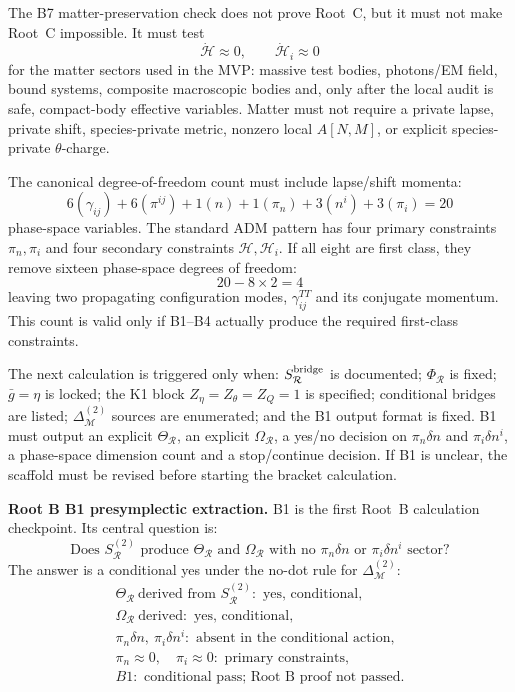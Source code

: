 \documentclass[11pt]{article}
\begin{document}
The B7 matter-preservation check does not prove Root~C, but it must not make
Root~C impossible.  It must test
\[
\boxed{\dot{\mathcal H}\approx0,\qquad \dot{\mathcal H}_i\approx0}
\]
for the matter sectors used in the MVP: massive test bodies, photons/EM field,
bound systems, composite macroscopic bodies and, only after the local audit is
safe, compact-body effective variables.  Matter must not require a private
lapse, private shift, species-private metric, nonzero local \(A[N,M]\), or
explicit species-private \(\theta\)-charge.

The canonical degree-of-freedom count must include lapse/shift momenta:
\[
\boxed{
6(\gamma_{ij})+6(\pi^{ij})+1(n)+1(\pi_n)+3(n^i)+3(\pi_i)=20
}
\]
phase-space variables.  The standard ADM pattern has four primary constraints
\(\pi_n,\pi_i\) and four secondary constraints
\(\mathcal H,\mathcal H_i\).  If all eight are first class, they remove
sixteen phase-space degrees of freedom:
\[
\boxed{20-8\times2=4}
\]
leaving two propagating configuration modes, \(\gamma_{ij}^{TT}\) and its
conjugate momentum.  This count is valid only if B1--B4 actually produce the
required first-class constraints.

The next calculation is triggered only when: \(S_{\mathcal R}^{\rm bridge}\)
is documented; \(\Phi_{\mathcal R}\) is fixed; \(\bar g=\eta\) is locked; the
K1 block \(Z_\eta=Z_\theta=Z_Q=1\) is specified; conditional bridges are
listed; \(\Delta_{\mathcal M}^{(2)}\) sources are enumerated; and the B1 output
format is fixed.  B1 must output an explicit \(\Theta_{\mathcal R}\), an
explicit \(\Omega_{\mathcal R}\), a yes/no decision on \(\pi_n\delta n\) and
\(\pi_i\delta n^i\), a phase-space dimension count and a stop/continue
decision.  If B1 is unclear, the scaffold must be revised before starting the
bracket calculation.

\medskip\noindent\textbf{Root B B1 presymplectic extraction.}
B1 is the first Root~B calculation checkpoint.  Its central question is:
\[
\boxed{
\text{Does }S_{\mathcal R}^{(2)}\text{ produce }
\Theta_{\mathcal R}\text{ and }\Omega_{\mathcal R}
\text{ with no }\pi_n\delta n\text{ or }\pi_i\delta n^i\text{ sector?}
}
\]
The answer is a conditional yes under the no-dot rule for
\(\Delta_{\mathcal M}^{(2)}\):
\[
\boxed{
\begin{gathered}
\Theta_{\mathcal R}\ \text{derived from }S_{\mathcal R}^{(2)}:
\text{ yes, conditional},\\
\Omega_{\mathcal R}\ \text{derived}: \text{ yes, conditional},\\
\pi_n\delta n,\ \pi_i\delta n^i:\text{ absent in the conditional action},\\
\pi_n\approx0,\quad \pi_i\approx0:\text{ primary constraints},\\
B1:\text{ conditional pass; Root~B proof not passed.}
\end{gathered}
}
\]
\end{document}
